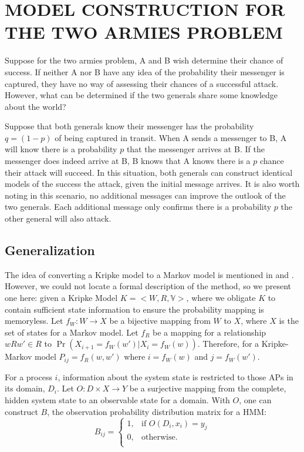 \section{MODEL CONSTRUCTION FOR THE TWO ARMIES PROBLEM}
Suppose for the two armies problem, A and B wish determine their chance of success.
If neither A nor B have any idea of the probability their messenger is captured, they have no way of assessing their chances of a successful attack.
However, what can be determined if the two generals share some knowledge about the world?

Suppose that both generals know their messenger has the probability $q=(1-p)$ of being captured in transit.
When A sends a messenger to B, A will know there is a probability $p$ that the messenger arrives at B.
If the messenger does indeed arrive at B, B knows that A knows there is a $p$ chance their attack will succeed.
In this situation, both generals can construct identical models of the success the attack, given the initial message arrives.
It is also worth noting in this scenario, no additional messages can improve the outlook of the two generals.
Each additional message only confirms there is a probability $p$ the other general will also attack.

\subsection{Generalization}

The idea of converting a Kripke model to a Markov model is mentioned in \cite{kripkemarkov1} and \cite{kripkemarkov2}.
However, we could not locate a formal description of the method, so we present one here:
given a Kripke Model $K = <W,R,\mathbb{V}>$, where we obligate $K$ to contain sufficient state information to ensure the probability mapping is memoryless.
Let $f_{W} : W \rightarrow X$ be a bijective mapping from $W$ to $X$, where $X$ is the set of states for a Markov model.
Let $f_{R}$ be a mapping for a relationship $wRw' \in R$ to $\Pr(X_{i+1}=f_W(w') | X_{i}=f_W(w))$.
Therefore, for a Kripke-Markov model $P_{ij} = f_R(w,w')$ where $i=f_W(w)$ and $j=f_W(w')$.

For a process $i$, information about the system state is restricted to those \ac{AP}s in its domain, $D_i$.
Let $O : D \times X \rightarrow Y$ be a surjective mapping from the complete, hidden system state to an observable state for a domain.
With $O$, one can construct $B$, the observation probability distribution matrix for a \ac{HMM}:
\begin{equation}
 B_{ij} =
   \begin{cases}
    1, & \text{if } O(D_i, x_i) = y_j\\
    0, & \text{otherwise.} \\
  \end{cases}
\end{equation}

